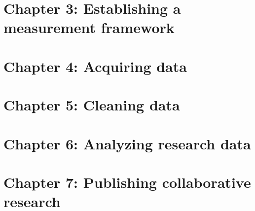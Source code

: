 \chapter{Chapter 3: Establishing a measurement framework}
\label{ch:3}






\chapter{Chapter 4: Acquiring data}
\label{ch:4}






\chapter{Chapter 5: Cleaning data}
\label{ch:5}




\chapter{Chapter 6: Analyzing research data}
\label{ch:6}




\chapter{Chapter 7: Publishing collaborative research}
\label{ch:7}



